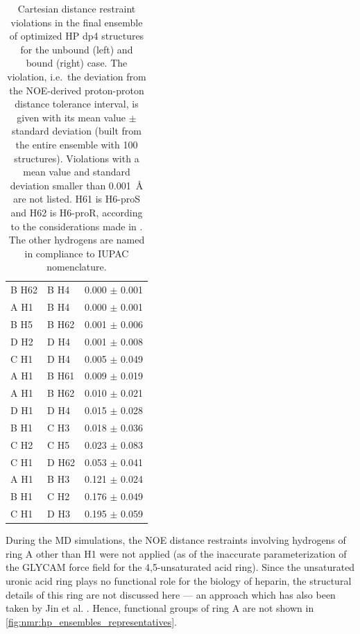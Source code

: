 \begin{table}
\begin{tabular}{llc}
B H62 & B H4 & 0.000 $\pm$ 0.001 \\
A H1 & B H4 & 0.000 $\pm$ 0.001 \\
B H5 & B H62 & 0.001 $\pm$ 0.006 \\
D H2 & D H4 & 0.001 $\pm$ 0.008 \\
C H1 & D H4 & 0.005 $\pm$ 0.049 \\
A H1 & B H61 & 0.009 $\pm$ 0.019 \\
A H1 & B H62 & 0.010 $\pm$ 0.021 \\
D H1 & D H4 & 0.015 $\pm$ 0.028 \\
B H1 & C H3 & 0.018 $\pm$ 0.036 \\
C H2 & C H5 & 0.023 $\pm$ 0.083 \\
C H1 & D H62 & 0.053 $\pm$ 0.041 \\
A H1 & B H3 & 0.121 $\pm$ 0.024 \\
B H1 & C H2 & 0.176 $\pm$ 0.049 \\
C H1 & D H3 & 0.195 $\pm$ 0.059 \\
\midrule
\end{tabular}
\caption{
Cartesian distance restraint violations in the final ensemble of optimized HP
dp4 structures for the unbound (left) and bound (right) case. The violation,
i.e.\ the deviation from the NOE-derived proton-proton distance tolerance
interval, is given with its mean value $\pm$ standard deviation (built from the
entire ensemble with 100 structures). Violations with a mean value and standard
deviation smaller than \SI{0.001}{\angstrom} are not listed. H61 is H6-proS and
H62 is H6-proR, according to the considerations made in
\cite{nishida_rotameric_nmr_1988}. The other hydrogens are named in compliance
to IUPAC nomenclature.}
\label{tab:nmr:restraint_viols_free}
\end{table}

During the MD simulations, the NOE distance restraints involving hydrogens of
ring A other than H1 were not applied (as of the inaccurate parameterization of
the GLYCAM force field for the 4,5-unsaturated acid ring). Since the unsaturated
uronic acid ring plays no functional role for the biology of heparin, the
structural details of this ring are not discussed here --- an approach which has
also been taken by Jin et al. \cite{jin_heparin_2009}. Hence, functional groups
of ring A are not shown in \cref{fig:nmr:hp_ensembles_representatives}.

